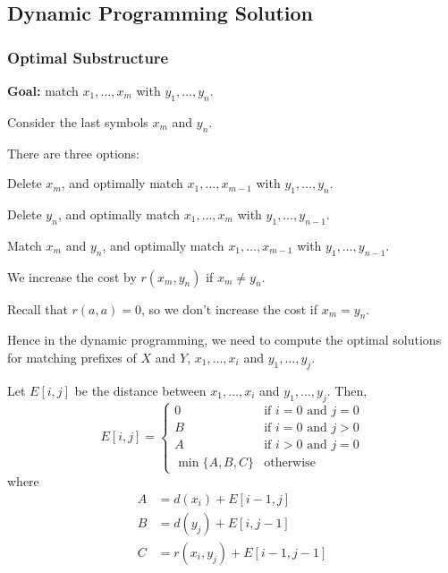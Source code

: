 \subsection{Dynamic Programming Solution}

\subsubsection{Optimal Substructure}

\begin{listu}
    \item \textbf{Goal:} match $x_1, \dots, x_m$ with $y_1, \dots, y_n$.

    \item Consider the last symbols $x_m$ and $y_n$.

    \item There are three options:
    
    \begin{listu}
        \item {\color{lightBlue}Delete} $x_m$, and optimally match $x_1, \dots, x_{m - 1}$ with $y_1, \dots, y_n$.
        \item {\color{lightBlue}Delete} $y_n$, and optimally match $x_1, \dots, x_m$ with $y_1, \dots, y_{n - 1}$.
        \item {\color{darkGreen}Match} $x_m$ and $y_n$, and optimally match $x_1, \dots, x_{m - 1}$ with $y_1, \dots, y_{n - 1}$.
        \begin{listu}
            \item We increase the cost by $r(x_m, y_n)$ if $x_m \ne y_n$.
            \item Recall that $r(a, a) = 0$, so we don't increase the cost if $x_m = y_n$.
        \end{listu}
    \end{listu}

    \item Hence in the dynamic programming, we need to compute the optimal solutions for matching prefixes of $X$ and $Y$, $x_1, \dots, x_i$ and $y_1, \dots, y_j$.
\end{listu}

Let $E[i, j]$ be the distance between $x_1, \dots, x_i$ and $y_1, \dots, y_j$. Then, \[
    E[i, j] = \begin{cases}
        0                 & \text{if } i = 0 \text{ and } j = 0 \\
        B                 & \text{if } i = 0 \text{ and } j > 0 \\
        A                 & \text{if } i > 0 \text{ and } j = 0 \\
        \min\{ A, B, C \} & \text{otherwise}
    \end{cases}
\] where \[
    \begin{aligned}
        A & = d(x_i) + E[i - 1, j]          \\
        B & = d(y_j) + E[i, j - 1]          \\
        C & = r(x_i, y_j) + E[i - 1, j - 1]
    \end{aligned}
\]

